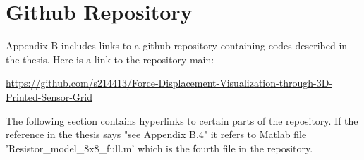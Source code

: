 \chapter{Github Repository}\label{app:git}
Appendix B includes links to a github repository containing codes described in the thesis. Here is a link to the repository main:


\url{https://github.com/s214413/Force-Displacement-Visualization-through-3D-Printed-Sensor-Grid}

The following section contains hyperlinks to certain parts of the repository. If the reference in the thesis says "see Appendix B.4" it refers to Matlab file 'Resistor\_model\_8x8\_full.m' which is the fourth file in the repository.



